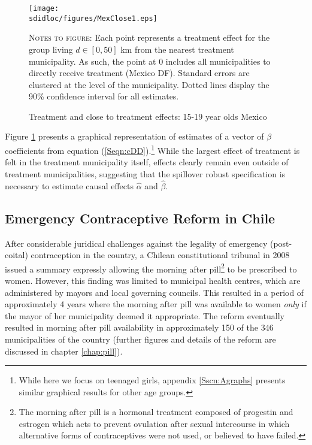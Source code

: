 \begin{figure}[h!]
\texttt{[image: \\sdidloc/figures/MexClose1.eps]}
\caption{Treatment and close to treatment effects: 15-19 year olds Mexico}
\label{SFig:MexClose}
\vspace{2mm}
\begin{footnotesize}
\textsc{Notes to figure}: Each point represents a treatment effect for the group
living $d\in [0,50]$ km from the nearest treatment municipality.  As such, the
point at 0 includes all municipalities to directly receive treatment (Mexico DF).
Standard errors are clustered at the level of the municipality.  Dotted lines 
display the 90\% confidence interval for all estimates.
\end{footnotesize}
\end{figure}
Figure \ref{SFig:MexClose} presents a graphical representation of estimates
of a vector of $\beta$ coefficients from equation (\ref{Seqn:cDD}).\footnote{
While here we focus on teenaged girls, appendix \ref{Sscn:Agraphs} presents
similar graphical results for other age groups.}  While the largest effect of 
treatment is felt in the treatment municipality itself, effects clearly remain 
even outside of treatment municipalities, suggesting that the spillover robust 
specification is necessary to estimate causal effects $\hat\alpha$ and 
$\hat\beta$.

\subsection{Emergency Contraceptive Reform in Chile}
After considerable juridical challenges against the legality of emergency 
(post-coital) contraception in the country, a Chilean constitutional tribunal in 
2008 issued a summary expressly allowing the morning after pill\footnote{The 
morning after pill is a hormonal treatment composed of progestin and estrogen 
which acts to prevent ovulation after sexual intercourse in which alternative 
forms of contraceptives were not used, or believed to have failed.} to be 
prescribed to women.  However, this finding was limited to municipal health 
centres, which are administered by mayors and local governing councils.  This
resulted in a period of approximately 4 years where the morning after pill was 
available to women \emph{only} if the mayor of her municipality deemed it 
appropriate.  The reform eventually resulted in morning after pill availability in 
approximately 150 of the 346 municipalities of the country (further figures and 
details of the reform are discussed in chapter \ref{chap:pill}).

